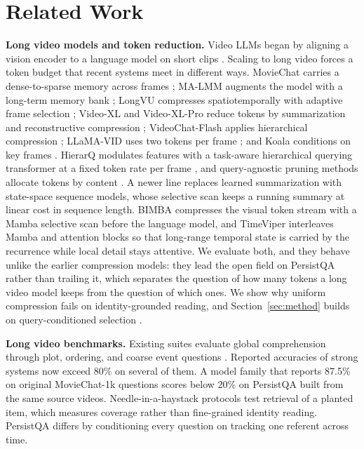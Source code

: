 \documentclass{article}
\newcommand{\bench}{PersistQA}
\begin{document}
\section{Related Work}
\label{sec:related}
\textbf{Long video models and token reduction.} Video LLMs began by aligning a vision encoder to a language model on short clips \citep{videollava,videochat,videochatgpt,llavaonevision,qwen2vl,qwen25vl,internvl25,internvl3,minicpmv,mplugowl3}. Scaling to long video forces a token budget that recent systems meet in different ways. MovieChat carries a dense-to-sparse memory across frames \citep{moviechat}; MA-LMM augments the model with a long-term memory bank \citep{malmm}; LongVU compresses spatiotemporally with adaptive frame selection \citep{longvu}; Video-XL and Video-XL-Pro reduce tokens by summarization and reconstructive compression \citep{videoxl,videoxlpro}; VideoChat-Flash applies hierarchical compression \citep{videochatflash}; LLaMA-VID uses two tokens per frame \citep{llamavid}; and Koala conditions on key frames \citep{koala}. HierarQ modulates features with a task-aware hierarchical querying transformer at a fixed token rate per frame \citep{hierarq}, and query-agnostic pruning methods allocate tokens by content \citep{apt,tome,fastv,prumerge}. A newer line replaces learned summarization with state-space sequence models, whose selective scan keeps a running summary at linear cost in sequence length. BIMBA compresses the visual token stream with a Mamba selective scan before the language model, and TimeViper interleaves Mamba and attention blocks so that long-range temporal state is carried by the recurrence while local detail stays attentive. We evaluate both, and they behave unlike the earlier compression models: they lead the open field on \bench{} rather than trailing it, which separates the question of how many tokens a long video model keeps from the question of which ones. We show why uniform compression fails on identity-grounded reading, and Section~\ref{sec:method} builds on query-conditioned selection \citep{flexselect,apt,sevila,framevoyager}.

\textbf{Long video benchmarks.} Existing suites evaluate global comprehension through plot, ordering, and coarse event questions \citep{videomme,mlvu,lvbench,longvideobench,egoschema,mvbench,activitynetqa,perceptiontest}. Reported accuracies of strong systems now exceed 80\% on several of them. A model family that reports 87.5\% on original MovieChat-1k questions scores below 20\% on \bench{} built from the same source videos. Needle-in-a-haystack protocols test retrieval of a planted item, which measures coverage rather than fine-grained identity reading. \bench{} differs by conditioning every question on tracking one referent across time.
\end{document}
